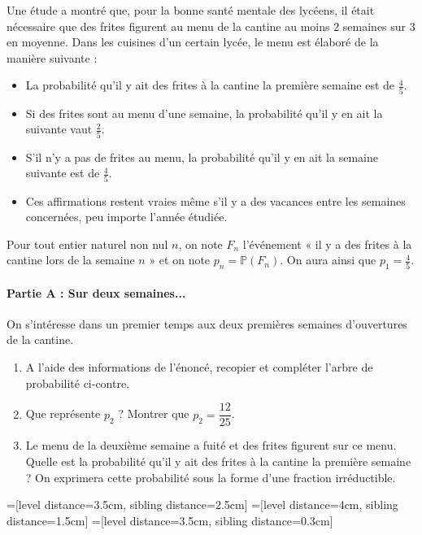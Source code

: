 \documentclass[11pt,fleqn, openany]{book} %
\begin{document}
\begin{exercise}
Une étude a montré que, pour la bonne santé mentale des lycéens, il était nécessaire que des frites figurent au menu de la cantine au moins 2 semaines sur 3 en moyenne. Dans les cuisines d'un certain lycée, le menu est élaboré de la manière suivante :
\begin{itemize}
\item La probabilité qu'il y ait des frites à la cantine la première semaine est de $\frac{4}{5}$.
    \item Si des frites sont au menu d'une semaine, la probabilité qu'il y en ait la suivante vaut $\frac{2}{5}$.
    \item S'il n'y a pas de frites au menu, la probabilité qu'il y en ait la semaine suivante est de $\frac{4}{5}$.
    \item Ces affirmations restent vraies même s'il y a des vacances entre les semaines concernées, peu importe l'année étudiée.
\end{itemize}
Pour tout entier naturel non nul $n$, on note $F_n$ l'événement « il y a des frites à la cantine lors de la semaine $n$ » et on note $p_n=\mathbb{P}(F_n)$. On aura ainsi que $p_1=\frac{4}{5}$.

\paragraph{Partie A : Sur deux semaines...}

On s'intéresse dans un premier temps aux deux premières semaines d'ouvertures de la cantine.

\begin{minipage}{0.58\linewidth}\begin{enumerate}
    \item A l'aide des informations de l'énoncé, recopier et compléter l'arbre de probabilité ci-contre.
    
    \item Que représente $p_2$ ? Montrer que $p_2=\dfrac{12}{25}$.
    \item Le menu de la deuxième semaine a fuité et des frites figurent sur ce menu. Quelle est la probabilité qu'il y ait des frites à la cantine la première semaine ? On exprimera cette probabilité sous la forme d'une fraction irréductible.
\end{enumerate} \end{minipage}\begin{minipage}{0.4\linewidth}


=[level distance=3.5cm, sibling distance=2.5cm]
=[level distance=4cm, sibling distance=1.5cm]
=[level distance=3.5cm, sibling distance=0.3cm]


\end{minipage}
\end{exercise}
\end{document}
